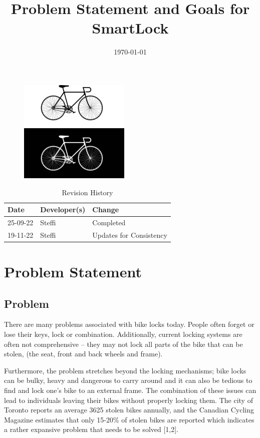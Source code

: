 \documentclass{article}
\title{Problem Statement and Goals for SmartLock\\\progname}
\author{\authname}
\date{\today}
\begin{document}
\maketitle
\thispagestyle{empty}
\begin{figure}[h!]
  \centering
  \includegraphics[width=0.4\linewidth]{../BikeLogo.jpg}
\end{figure}

\newpage
{}
\begin{table}[hp]
\caption{Revision History} \label{TblRevisionHistory}
\begin{tabularx}{\textwidth}{llX}
\toprule
\textbf{Date} & \textbf{Developer(s)} & \textbf{Change}\\
\midrule
25-09-22 & Steffi & Completed\\
19-11-22 & Steffi & Updates for Consistency\\
\bottomrule
\end{tabularx}
\end{table}

\newpage
\tableofcontents

\newpage
{}
\section{Problem Statement}

\subsection{Problem}

There are many problems associated with bike locks today.  People often forget or lose their keys, lock or combination.  Additionally, current locking systems are often not comprehensive – they may not lock all parts of the bike that can be stolen, (the seat, front and back wheels and frame). 

Furthermore, the problem stretches beyond the locking mechanisms; bike locks can be bulky, heavy and dangerous to carry around and it can also be tedious to find and lock one’s bike to an external frame.  The combination of these issues can lead to individuals leaving their bikes without properly locking them.  The city of Toronto reports an average 3625 stolen bikes annually, and the Canadian Cycling Magazine estimates that only 15-20\% of stolen bikes are reported which indicates a rather expansive problem that needs to be solved [1,2]. 
\end{document}
